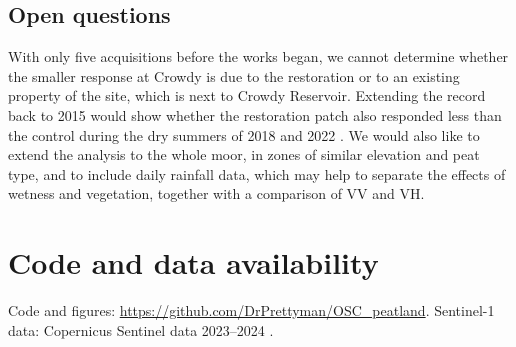 \documentclass[10pt,a4paper,twocolumn]{article}
\begin{document}
\subsection{Open questions}
With only five acquisitions before the works began, we cannot determine whether the smaller response at Crowdy is due to the restoration or to an existing property of the site, which is next to Crowdy Reservoir.
Extending the record back to 2015 would show whether the restoration patch also responded less than the control during the dry summers of 2018 and 2022 \cite{ea2022}.
We would also like to extend the analysis to the whole moor, in zones of similar elevation and peat type, and to include daily rainfall data, which may help to separate the effects of wetness and vegetation, together with a comparison of VV and VH.

\section*{Code and data availability}
Code and figures: \url{https://github.com/DrPrettyman/OSC_peatland}.
Sentinel-1 data: Copernicus Sentinel data 2023--2024 \cite{torres2012}.
\end{document}

